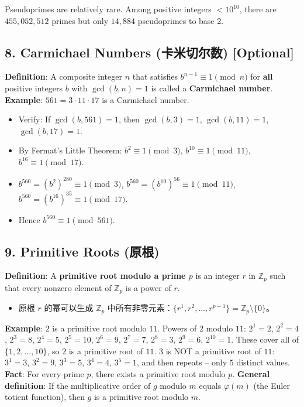 \documentclass[10pt,a4paper,openany]{ctexbook}
\theoremstyle{definition}
\theoremstyle{remark}
\begin{document}
Pseudoprimes are relatively rare. Among positive integers $< 10^{10}$, there are $455,052,512$ primes but only $14,884$ pseudoprimes to base 2.
\vspace{-2pt}

\subsection{8. Carmichael Numbers (卡米切尔数) [Optional]}

\textbf{Definition}: A composite integer $n$ that satisfies $b^{n-1} \equiv 1 \pmod{n}$ for \textbf{all} positive integers $b$ with $\gcd(b, n) = 1$ is called a \textbf{Carmichael number}.
\textbf{Example}: $561 = 3 \cdot 11 \cdot 17$ is a Carmichael number.
\begin{itemize}
\item Verify: If $\gcd(b, 561) = 1$, then $\gcd(b, 3) = 1$, $\gcd(b, 11) = 1$, $\gcd(b, 17) = 1$.
\item By Fermat's Little Theorem: $b^2 \equiv 1 \pmod{3}$, $b^{10} \equiv 1 \pmod{11}$, $b^{16} \equiv 1 \pmod{17}$.
\item $b^{560} = (b^2)^{280} \equiv 1 \pmod{3}$, $b^{560} = (b^{10})^{56} \equiv 1 \pmod{11}$, $b^{560} = (b^{16})^{35} \equiv 1 \pmod{17}$.
\item Hence $b^{560} \equiv 1 \pmod{561}$.

\end{itemize}

\vspace{-2pt}

\subsection{9. Primitive Roots (原根)}

\textbf{Definition}: A \textbf{primitive root modulo a prime $p$} is an integer $r$ in $\mathbb{Z}_p$ such that every nonzero element of $\mathbb{Z}_p$ is a power of $r$.
\begin{itemize}
\item 原根 $r$ 的幂可以生成 $\mathbb{Z}_p$ 中所有非零元素：$\{r^1, r^2, \dots, r^{p-1}\} = \mathbb{Z}_p \setminus \{0\}$。

\end{itemize}

\textbf{Example}: $2$ is a primitive root modulo $11$.
Powers of $2$ modulo $11$:
$2^1 = 2$, $2^2 = 4$, $2^3 = 8$, $2^4 = 5$, $2^5 = 10$, $2^6 = 9$, $2^7 = 7$, $2^8 = 3$, $2^9 = 6$, $2^{10} = 1$.
These cover all of $\{1,2,\dots,10\}$, so $2$ is a primitive root of $11$.
$3$ is NOT a primitive root of $11$:
$3^1 = 3$, $3^2 = 9$, $3^3 = 5$, $3^4 = 4$, $3^5 = 1$, and then repeats -- only $5$ distinct values.
\textbf{Fact}: For every prime $p$, there exists a primitive root modulo $p$.
\textbf{General definition}: If the multiplicative order of $g$ modulo $m$ equals $\varphi(m)$ (the Euler totient function), then $g$ is a primitive root modulo $m$.
\vspace{-2pt}
\end{document}
